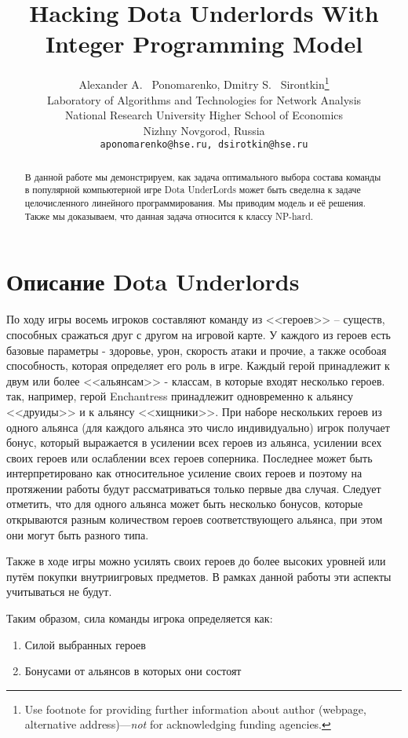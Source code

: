 \documentclass{article}
\title{Hacking Dota Underlords With Integer Programming Model}
\author{
  Alexander A. ~Ponomarenko, Dmitry S. ~Sirontkin\thanks{Use footnote for providing further
    information about author (webpage, alternative
    address)---\emph{not} for acknowledging funding agencies.} \\
  Laboratory of Algorithms and Technologies for Network Analysis\\
  National Research University Higher School of Economics \\
  Nizhny Novgorod, Russia\\
  \texttt{aponomarenko@hse.ru, dsirotkin@hse.ru} \\
}
\begin{document}
\maketitle

\begin{abstract}
В данной работе мы демонстрируем, как задача оптимального выбора состава команды в популярной компьютерной игре Dota UnderLords может быть сведелна к задаче целочисленного линейного программирования. Мы приводим модель и её решения. Также мы доказываем, что данная задача относится к классу NP-hard. 
\end{abstract}




\section{Описание Dota Underlords}

По ходу игры восемь игроков составляют команду из <<героев>> – существ, способных сражаться друг с другом на игровой карте. У каждого из героев есть базовые параметры - здоровье, урон, скорость атаки и прочие, а также особоая способность, которая определяет его роль в игре. Каждый герой принадлежит к двум или более <<альянсам>> - классам, в которые входят несколько героев. так, например, герой Enchantress принадлежит одновременно к альянсу <<друиды>> и к альянсу <<хищники>>. При наборе нескольких героев из одного альянса (для каждого альянса это число индивидуально) игрок получает бонус, который выражается в усилении всех героев из альянса, усилении всех своих героев или ослаблении всех героев соперника. Последнее может быть интерпретировано как относительное усиление своих героев и поэтому на протяжении работы будут рассматриваться только первые два случая. Следует отметить, что для одного альянса может быть несколько бонусов, которые открываются разным количеством героев соответствующего альянса, при этом они могут быть разного типа.

Также в ходе игры можно усилять своих героев до более высоких уровней или путём покупки внутриигровых предметов. В рамках данной работы эти аспекты учитываться не будут.

Таким образом, сила команды игрока определяется как:

\begin{enumerate}
    \item Силой выбранных героев
    \item Бонусами от альянсов в которых они состоят
\end{enumerate}
\end{document}
